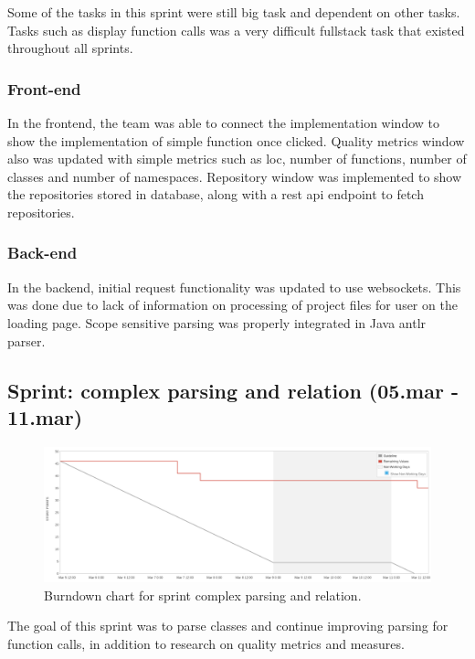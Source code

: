 Some of the tasks in this \gls{sprint} were still big task and dependent on other tasks. Tasks such as display function calls was a very difficult \gls{fullstack} task that existed throughout all \glspl{sprint}. 

\subsubsection{Front-end}
In the \gls{frontend}, the team was able to connect the implementation window to show the implementation of simple function once clicked. Quality metrics window also was updated with simple metrics such as \gls{loc}, number of functions, number of classes and number of \glspl{namespace}. Repository window was implemented to show the repositories stored in database, along with a \gls{rest} \gls{api} endpoint to fetch repositories.

\subsubsection{Back-end}
In the \gls{backend}, initial request functionality was updated to use \glspl{websocket}. This was done due to lack of information on processing of project files for user on the loading page. Scope sensitive parsing was properly integrated in Java \gls{antlr} parser.

\subsection{Sprint: complex parsing and relation (05.mar - 11.mar)}
\begin{figure}[H] 
    \includegraphics[width=\textwidth]{inc/images/sprints/sprintComplexParsingandRelation050319-110319.png}
    \caption{Burndown chart for sprint complex parsing and relation.}
    \label{fig:sprintComplexParsingAndRelation}
\end{figure}

The goal of this \gls{sprint} was to parse classes and continue improving parsing for function calls, in addition to research on quality metrics and measures.

